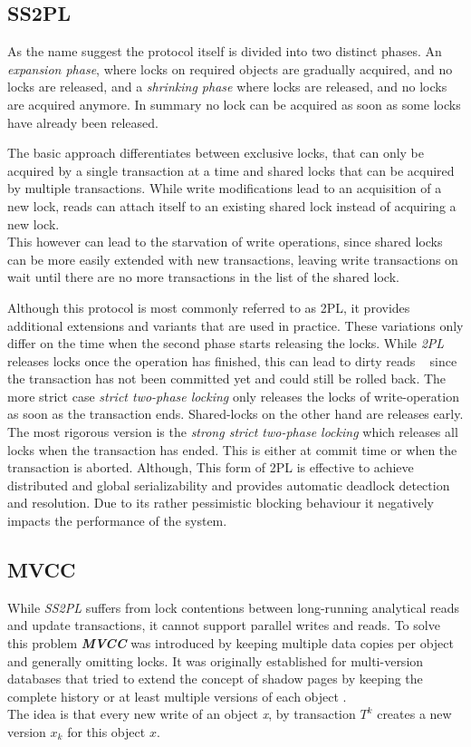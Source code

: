 \subsection{SS2PL}

As the name suggest the protocol itself is divided into two distinct phases. An \emph{expansion phase}, where locks on required objects are gradually acquired, 
and no locks are released, and a \emph{shrinking phase} where locks are released, and no locks are acquired anymore.
In summary no lock can be acquired as soon as some locks have already been released.

The basic approach differentiates between exclusive locks, that can only be acquired by a single transaction at a time and shared locks that 
can be acquired by multiple transactions. While write modifications lead to an acquisition of a new lock, reads can attach itself to an existing shared lock 
instead of acquiring a new lock. \\
This however can lead to the starvation of write operations, since shared locks can be more easily extended with new transactions, leaving write transactions on wait until 
there are no more transactions in the list of the shared lock. 

Although this protocol is most commonly referred to as 2PL, it provides additional extensions and variants that are used in practice. 
These variations only differ on the time when the second phase starts releasing the locks. 
While \emph{2PL} releases locks once the operation has finished, this can lead to dirty 
reads ~\cite{} since the transaction has not been committed yet and could still be rolled back.
The more strict case \emph{strict two-phase locking} only releases the locks of write-operation as soon as the transaction ends.
Shared-locks on the other hand are releases early.
The most rigorous version is the \emph{strong strict two-phase locking} which releases all locks when the transaction has ended.
This is either at commit time or when the transaction is aborted.
Although, This form of 2PL is effective to achieve distributed and global serializability and provides automatic deadlock detection and resolution.
Due to its rather pessimistic blocking behaviour it negatively impacts the performance of the system.



\subsection{MVCC}
While \emph{SS2PL} suffers from lock contentions between long-running analytical reads and update transactions, it cannot support parallel writes and reads. 
To solve this problem \emph{\textbf{MVCC}} \cite{bernstein:1981} was introduced by keeping multiple data copies per object and generally omitting locks.
It was originally established for multi-version databases that tried to extend the concept of shadow pages by keeping the complete history or at least multiple versions 
of each object \cite{bernstein:1982, bernstein:1983}.\\
The idea is that every new write of an object \emph{x}, by transaction $T^k$ creates a new version $x_k$ for this object $x$.

